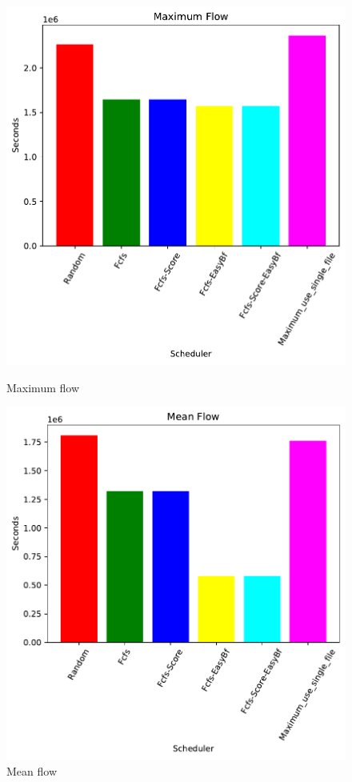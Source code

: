 \documentclass[a4paper]{article}
\begin{document}
	\begin{figure}[H]
	\begin{minipage}[b]{0.5\linewidth}\centering\includegraphics[width=1\linewidth]{MBSS/plot/2021-05-23-800_Maximum_flow4nodes.pdf}\caption{Maximum flow}\vspace{4ex}\end{minipage}
	\begin{minipage}[b]{0.5\linewidth}\centering\includegraphics[width=1\linewidth]{MBSS/plot/2021-05-23-800_Mean_flow4nodes.pdf}\caption{Mean flow}\vspace{4ex}\end{minipage} 

\end{figure}
\end{document}
